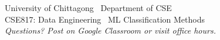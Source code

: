 \documentclass[12pt,a4paper]{article}
\begin{document}
\vspace{1.5cm}
\begin{center}
\begin{tcolorbox}[width=10cm, colback=GrayBg, colframe=NavyBlue, sharp corners, center title,
  title={\textbf{End of Lecture Notes}}]
\centering
\small\color{DarkGray}
University of Chittagong \textbullet\ Department of CSE\\
CSE817: Data Engineering \textbullet\ ML Classification Methods\\[4pt]
\textit{Questions? Post on Google Classroom or visit office hours.}
\end{tcolorbox}
\end{center}
\end{document}
